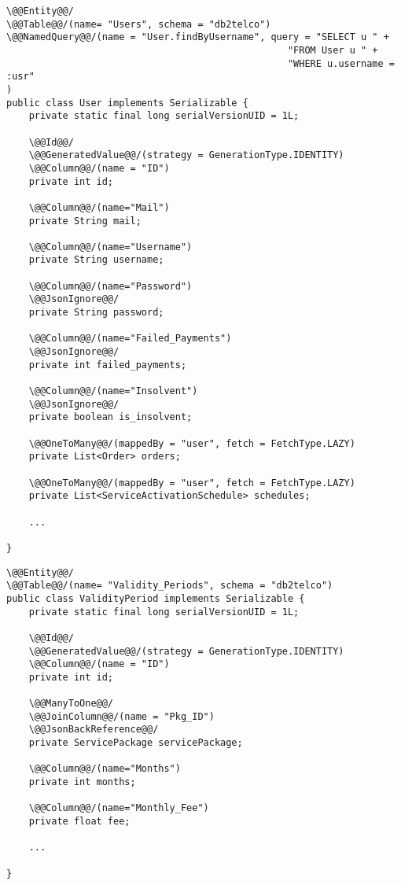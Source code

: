 \begin{lstlisting}[style = JPA]
\@@Entity@@/
\@@Table@@/(name= "Users", schema = "db2telco")
\@@NamedQuery@@/(name = "User.findByUsername", query = "SELECT u " + 
                                                  "FROM User u " + 
                                                  "WHERE u.username = :usr"
)
public class User implements Serializable {
    private static final long serialVersionUID = 1L;

    \@@Id@@/
    \@@GeneratedValue@@/(strategy = GenerationType.IDENTITY)
    \@@Column@@/(name = "ID")
    private int id;

    \@@Column@@/(name="Mail")
    private String mail;

    \@@Column@@/(name="Username")
    private String username;

    \@@Column@@/(name="Password")
    \@@JsonIgnore@@/
    private String password;

    \@@Column@@/(name="Failed_Payments")
    \@@JsonIgnore@@/
    private int failed_payments;

    \@@Column@@/(name="Insolvent")
    \@@JsonIgnore@@/
    private boolean is_insolvent;

    \@@OneToMany@@/(mappedBy = "user", fetch = FetchType.LAZY)
    private List<Order> orders;

    \@@OneToMany@@/(mappedBy = "user", fetch = FetchType.LAZY)
    private List<ServiceActivationSchedule> schedules;
    
    ...

}
\end{lstlisting}

\begin{lstlisting}[style = JPA]
\@@Entity@@/
\@@Table@@/(name= "Validity_Periods", schema = "db2telco")
public class ValidityPeriod implements Serializable {
    private static final long serialVersionUID = 1L;

    \@@Id@@/
    \@@GeneratedValue@@/(strategy = GenerationType.IDENTITY)
    \@@Column@@/(name = "ID")
    private int id;

    \@@ManyToOne@@/
    \@@JoinColumn@@/(name = "Pkg_ID")
    \@@JsonBackReference@@/
    private ServicePackage servicePackage;

    \@@Column@@/(name="Months")
    private int months;

    \@@Column@@/(name="Monthly_Fee")
    private float fee;
    
    ...

}
\end{lstlisting}